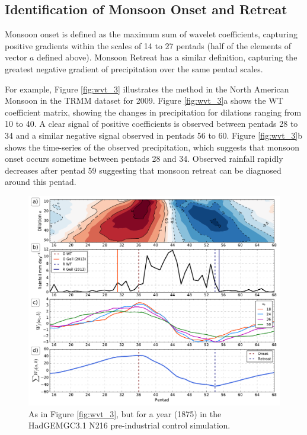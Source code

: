 \subsection{Identification of Monsoon Onset and Retreat}
 Monsoon onset is defined as the maximum sum of wavelet coefficients, capturing positive gradients within the scales of 14 to 27 pentads (half of the elements of vector $a$ defined above). Monsoon Retreat has a similar definition, capturing the greatest negative gradient of precipitation over the same pentad scales.

For example, Figure \ref{fig:wvt_3} illustrates the method in the North American Monsoon in the TRMM dataset for 2009. Figure \ref{fig:wvt_3}a shows the WT coefficient matrix, showing the changes in precipitation for dilations ranging from 10 to 40. A clear signal of positive coefficients is observed between pentads 28 to 34  and a similar negative signal observed in pentads 56 to 60. Figure \ref{fig:wvt_3}b shows the time-series of the observed precipitation, which suggests that monsoon onset occurs sometime between pentads 28 and 34. Observed rainfall rapidly decreases after pentad 59 suggesting that monsoon retreat can be diagnosed around this pentad.

\begin{figure}
 \includegraphics[width=\linewidth]{figures/nam_n216.pdf}
\caption[Example determination of onset and retreat in HadGEM3 N216]{ As in Figure \ref{fig:wvt_3}, but for a year (1875) in the HadGEMGC3.1 N216 pre-industrial control simulation.  }
\label{fig:s1_n216}
\end{figure}

